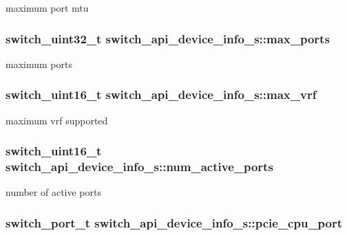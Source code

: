 maximum port mtu \hypertarget{structswitch__api__device__info__s_aa51241cbf2c66c030e6dbdd3734512a1}{
\subsubsection[{max\+\_\+ports}]{\setlength{\rightskip}{0pt plus 5cm}switch\+\_\+uint32\+\_\+t switch\+\_\+api\+\_\+device\+\_\+info\+\_\+s\+::max\+\_\+ports}}\label{structswitch__api__device__info__s_aa51241cbf2c66c030e6dbdd3734512a1}
maximum ports \hypertarget{structswitch__api__device__info__s_aa8590487144b0fe01959b7b717f68022}{
\subsubsection[{max\+\_\+vrf}]{\setlength{\rightskip}{0pt plus 5cm}switch\+\_\+uint16\+\_\+t switch\+\_\+api\+\_\+device\+\_\+info\+\_\+s\+::max\+\_\+vrf}}\label{structswitch__api__device__info__s_aa8590487144b0fe01959b7b717f68022}
maximum vrf supported \hypertarget{structswitch__api__device__info__s_a7e1c4e293a457ef2c6edc1a83a13c52a}{
\subsubsection[{num\+\_\+active\+\_\+ports}]{\setlength{\rightskip}{0pt plus 5cm}switch\+\_\+uint16\+\_\+t switch\+\_\+api\+\_\+device\+\_\+info\+\_\+s\+::num\+\_\+active\+\_\+ports}}\label{structswitch__api__device__info__s_a7e1c4e293a457ef2c6edc1a83a13c52a}
number of active ports \hypertarget{structswitch__api__device__info__s_a16ae76a1071523609b503735c3bea431}{
\subsubsection[{pcie\+\_\+cpu\+\_\+port}]{\setlength{\rightskip}{0pt plus 5cm}switch\+\_\+port\+\_\+t switch\+\_\+api\+\_\+device\+\_\+info\+\_\+s\+::pcie\+\_\+cpu\+\_\+port}}\label{structswitch__api__device__info__s_a16ae76a1071523609b503735c3bea431}
